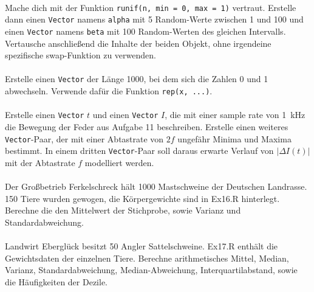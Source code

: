 \documentclass[paper=A4, pagesize, DIV=calc, smallheadings,
fontsize=12pt, expansion=false]{scrreprt}
\begin{document}
\paragraph{}
Mache dich mit der Funktion \texttt{runif(n, min = 0, max = 1)} vertraut. Erstelle dann einen \texttt{Vector} 
namens \texttt{alpha} mit 5 
Random-Werte zwischen 1 und 100 und einen \texttt{Vector} namens \texttt{beta} mit 100 Random-Werten des gleichen 
Intervalls.
Vertausche anschließend die Inhalte der beiden Objekt, ohne irgendeine spezifische swap-Funktion zu verwenden.

\paragraph{}
Erstelle einen \texttt{Vector} der Länge 1000, bei dem sich die Zahlen 0 und 1 abwechseln. Verwende dafür die Funktion 
\texttt{rep(x, ...)}.

\paragraph{}
Erstelle einen \texttt{Vector} $t$ und einen \texttt{Vector} $I$, die mit einer sample rate von \SI{1}{kHz} die 
Bewegung der Feder aus Aufgabe 11 %
beschreiben.
Erstelle einen weiteres \texttt{Vector}-Paar, der mit einer Abtastrate von $2f$ ungefähr Minima und Maxima bestimmt.
In einem dritten \texttt{Vector}-Paar soll daraus erwarte Verlauf von $|\Delta I(t)|$ mit der Abtastrate $f$ modelliert 
werden.

\paragraph{}

Der Großbetrieb Ferkelschreck hält 1000 Mastschweine der Deutschen Landrasse. 150 Tiere wurden gewogen, die 
Körpergewichte sind in Ex16.R hinterlegt. Berechne die den Mittelwert der Stichprobe, sowie Varianz und 
Standardabweichung.

\paragraph{}
Landwirt Eberglück besitzt 50 Angler Sattelschweine. Ex17.R enthält die Gewichtsdaten der einzelnen Tiere. Berechne 
arithmetisches Mittel, Median, Varianz, 
Standardabweichung, Median-Abweichung, Interquartilabstand, sowie die Häufigkeiten der Dezile.
\end{document}
